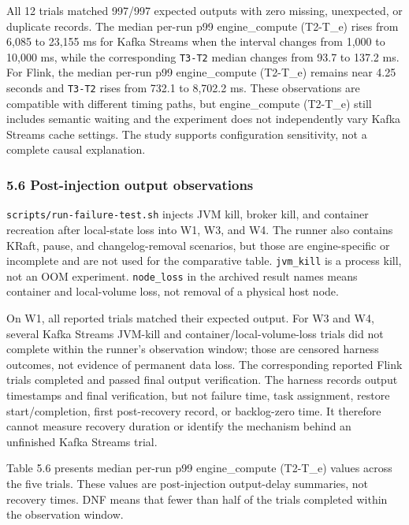 \documentclass[
]{article}
\begin{document}
All 12 trials matched 997/997 expected outputs with zero missing,
unexpected, or duplicate records. The median per-run p99 engine_compute (T2-T_e)
rises from 6,085 to 23,155 ms for Kafka Streams when the interval
changes from 1,000 to 10,000 ms, while the corresponding \texttt{T3-T2}
median changes from 93.7 to 137.2 ms. For Flink, the median per-run p99
engine_compute (T2-T_e) remains near 4.25 seconds and \texttt{T3-T2} rises from
732.1 to 8,702.2 ms. These observations are compatible with different
timing paths, but engine_compute (T2-T_e) still includes semantic waiting and the
experiment does not independently vary Kafka Streams cache settings. The
study supports configuration sensitivity, not a complete causal
explanation.

\hypertarget{post-injection-output-observations}{%
\subsubsection{5.6 Post-injection output
observations}\label{post-injection-output-observations}}

\texttt{scripts/run-failure-test.sh} injects JVM kill, broker kill, and
container recreation after local-state loss into W1, W3, and W4. The
runner also contains KRaft, pause, and changelog-removal scenarios, but
those are engine-specific or incomplete and are not used for the
comparative table. \texttt{jvm\_kill} is a process kill, not an OOM
experiment. \texttt{node\_loss} in the archived result names means
container and local-volume loss, not removal of a physical host node.

On W1, all reported trials matched their expected output. For W3 and W4,
several Kafka Streams JVM-kill and container/local-volume-loss trials
did not complete within the runner's observation window; those are
censored harness outcomes, not evidence of permanent data loss. The
corresponding reported Flink trials completed and passed final output
verification. The harness records output timestamps and final
verification, but not failure time, task assignment, restore
start/completion, first post-recovery record, or backlog-zero time. It
therefore cannot measure recovery duration or identify the mechanism
behind an unfinished Kafka Streams trial.

Table 5.6 presents median per-run p99 engine_compute (T2-T_e) values across the
five trials. These values are post-injection output-delay summaries, not
recovery times. DNF means that fewer than half of the trials completed
within the observation window.
\end{document}
